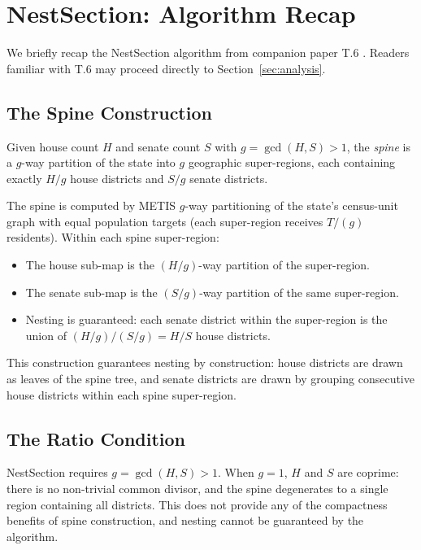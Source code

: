 \section{NestSection: Algorithm Recap}
\label{sec:nestsection}

We briefly recap the NestSection algorithm from companion paper T.6
\citep{dellaLibera2026nestSection}. Readers familiar with T.6 may proceed
directly to Section~\ref{sec:analysis}.

\subsection{The Spine Construction}
\label{sec:nestsection:spine}

\begin{definition}[Spine]
  Given house count $H$ and senate count $S$ with $g = \gcd(H, S) > 1$,
  the \emph{spine} is a $g$-way partition of the state into $g$ geographic
  super-regions, each containing exactly $H/g$ house districts and $S/g$
  senate districts.
\end{definition}

The spine is computed by METIS $g$-way partitioning of the state's
census-unit graph with equal population targets (each super-region receives
$T/(g)$ residents). Within each spine super-region:
\begin{itemize}
  \item The house sub-map is the $(H/g)$-way partition of the super-region.
  \item The senate sub-map is the $(S/g)$-way partition of the same super-region.
  \item Nesting is guaranteed: each senate district within the super-region
    is the union of $(H/g) / (S/g) = H/S$ house districts.
\end{itemize}

This construction guarantees nesting by construction: house districts are drawn
as leaves of the spine tree, and senate districts are drawn by grouping
consecutive house districts within each spine super-region.

\subsection{The Ratio Condition}
\label{sec:nestsection:ratio}

NestSection requires $g = \gcd(H, S) > 1$. When $g = 1$, $H$ and $S$ are
coprime: there is no non-trivial common divisor, and the spine degenerates to
a single region containing all districts. This does not provide any of the
compactness benefits of spine construction, and nesting cannot be guaranteed
by the algorithm.

